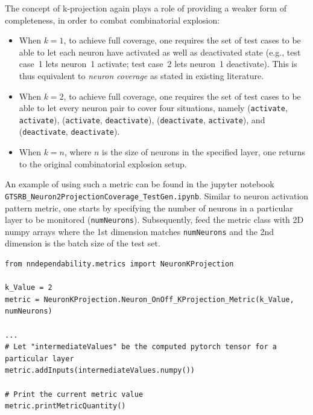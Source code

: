 \documentclass{article}
\begin{document}
\vspace{2mm}
The concept of k-projection again plays a role of providing a weaker form of completeness, in order to combat combinatorial explosion:

\begin{itemize}
    \item When $k=1$, to achieve full coverage, one requires the set of test cases to be able to let each neuron have activated as well as deactivated state (e.g., test case~1 lets neuron~1 activate; test case~2 lets neuron~1 deactivate). This is thus equivalent to \emph{neuron coverage} as stated in existing literature.
    \item When $k=2$, to achieve full coverage, one requires the set of test cases to be able to let every neuron pair to cover four situations, namely (\texttt{activate}, \texttt{activate}), (\texttt{activate}, \texttt{deactivate}), (\texttt{deactivate}, \texttt{activate}),  and \\(\texttt{deactivate}, \texttt{deactivate}).
    
    \item When $k=n$, where $n$ is the size of neurons in the specified layer, one returns to the original combinatorial explosion setup. 
    
\end{itemize}

An example of using such a metric can be found in the jupyter notebook \texttt{GTSRB\_Neuron2ProjectionCoverage\_TestGen.ipynb}. Similar to neuron activation pattern metric, one starts by specifying the number of neurons in a particular layer to be monitored (\texttt{numNeurons}). Subsequently, feed the metric class with 2D numpy arrays where the 1st dimension matches \texttt{numNeurons} and the 2nd dimension is the batch size of the test set.  


\begin{small}
\color{blue}
\begin{verbatim}
from nndependability.metrics import NeuronKProjection

k_Value = 2
metric = NeuronKProjection.Neuron_OnOff_KProjection_Metric(k_Value, numNeurons)

...
# Let "intermediateValues" be the computed pytorch tensor for a particular layer
metric.addInputs(intermediateValues.numpy())

# Print the current metric value
metric.printMetricQuantity()
\end{verbatim}
\end{small}
\end{document}
